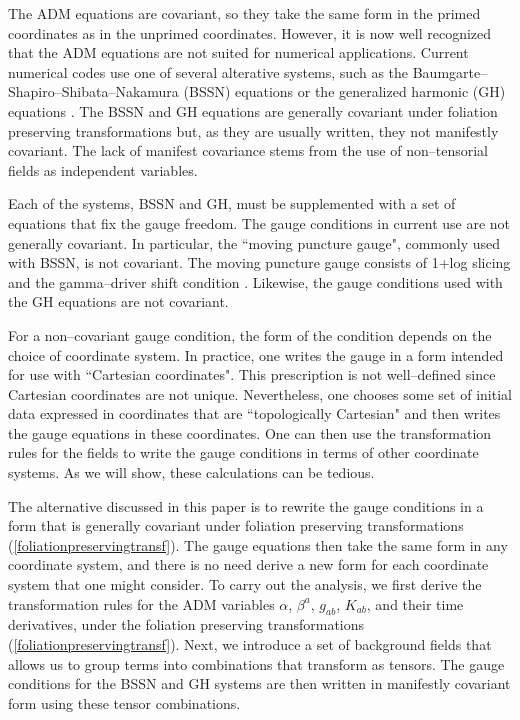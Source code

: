 The ADM equations are covariant, so they take the same form in the primed coordinates as in the unprimed coordinates. However, it is now 
well recognized that the ADM equations 
are not suited for numerical applications. Current numerical codes use one of several alterative systems, such as the 
Baumgarte--Shapiro--Shibata--Nakamura (BSSN) equations \cite{Shibata:1995we,Baumgarte:1998te} or the generalized harmonic (GH) 
equations \cite{Friedrich:1985,Garfinkle:2001ni}.
The BSSN and GH equations are generally covariant under foliation preserving transformations but, as they are usually written, 
they not manifestly covariant. The lack of manifest covariance stems from the use of non--tensorial fields as independent variables. 

Each of the systems, BSSN and GH, must be supplemented with a set of equations that fix the gauge freedom. 
The gauge conditions in current use are not generally covariant. In particular, the ``moving puncture gauge", commonly used with BSSN, is not covariant. 
The moving puncture gauge consists of 1+log slicing \cite{Bona:1994dr} and the
gamma--driver shift condition \cite{Alcubierre:2002kk}.  Likewise, the gauge conditions used 
with the GH equations \cite{Pretorius:2006tp,Szilagyi:2009qz, Lindblom:2009tu} are not covariant.  

For a non--covariant gauge condition, the form of the condition depends on the choice of coordinate system. 
In practice, one writes the gauge  in a form intended for use with ``Cartesian coordinates". This prescription is not  well--defined 
since Cartesian coordinates are not unique. Nevertheless, one chooses some set of initial data expressed in coordinates that are ``topologically Cartesian"  
and then writes the gauge equations in these coordinates.  One can then use the transformation rules for the fields to write the gauge conditions in terms of 
other coordinate systems. As we will show, these calculations can be tedious. 

The alternative discussed in this paper is to rewrite the gauge conditions in a form that is generally covariant under foliation preserving 
transformations (\ref{foliationpreservingtransf}). The gauge equations then take the same form in any coordinate system, and there is no need derive a new form 
for each coordinate system that one might consider. To carry out the analysis, we first derive the transformation rules for the ADM variables $\alpha$, $\beta^a$, 
$g_{ab}$, $K_{ab}$, and their time derivatives, under the foliation preserving transformations (\ref{foliationpreservingtransf}). Next, we introduce a 
set of background fields that allows us to group terms into combinations that transform as tensors. The gauge conditions for the BSSN and GH systems are 
then written in manifestly covariant form using these tensor combinations. 

